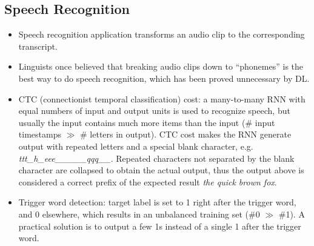 \subsection{Speech Recognition}
\begin{itemize}
  \item Speech recognition application transforms an audio clip to the corresponding transcript.
  \item Linguists once believed that breaking audio clips down to ``phonemes'' is the best way to do speech recognition, which has been proved unnecessary by DL.
  \item CTC (connectionist temporal classification) cost: a many-to-many RNN with equal numbers of input and output units is used to recognize speech, but usually the input contains much more items than the input (\# input timestamps $\gg$ \# letters in output). CTC cost makes the RNN generate output with repeated letters and a special blank character, e.g. \textit{ttt\_h\_eee\_\_\textvisiblespace\_\_\_qqq\_\_}. Repeated characters not separated by the blank character are collapsed to obtain the actual output, thus the output above is considered a correct prefix of the expected result \textit{the quick brown fox}.
  \item Trigger word detection: target label is set to 1 right after the trigger word, and 0 elsewhere, which results in an unbalanced training set (\#0 $\gg$ \#1). A practical solution is to output a few 1s instead of a single 1 after the trigger word.
\end{itemize}

\ifx\PREAMBLE\undefined

\fi